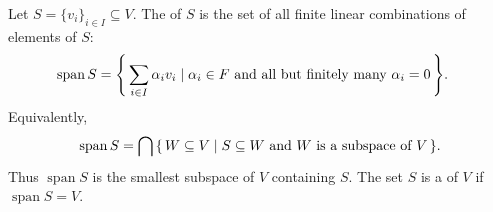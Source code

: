 \begin{Definition}\label{def:Span}
Let $S=\{v_i\}_{i\in I}\subseteq V$. The  of $S$ is the set of all finite linear combinations of elements of $S$:
\begin{align*}
\operatorname{span}S
&=\qty{\, \sum_{i\in I}\alpha_iv_i \mid
\alpha_i\in F\text{ and all but finitely many }\alpha_i=0 \,}.
\end{align*}
Equivalently,
\begin{equation*}
\operatorname{span}S
=\bigcap\qty{\, W\subseteq V \mid S\subseteq W\text{ and }W\text{ is a subspace of }V \,}.
\end{equation*}
Thus $\operatorname{span}S$ is the smallest subspace of $V$ containing $S$. The set $S$ is a  of $V$ if $\operatorname{span}S=V$.
\end{Definition}


